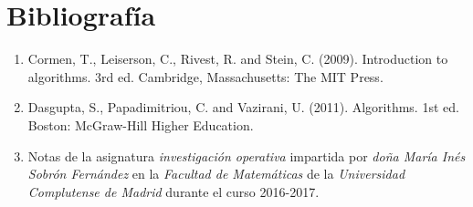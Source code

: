 \section{Bibliografía}

\begin{enumerate}
\item Cormen, T., Leiserson, C., Rivest, R. and Stein, C. (2009). Introduction to algorithms. 3rd ed. Cambridge, Massachusetts: The MIT Press.
\item Dasgupta, S., Papadimitriou, C. and Vazirani, U. (2011). Algorithms. 1st ed. Boston: McGraw-Hill Higher Education.
\item Notas de la asignatura \textit{investigación operativa} impartida por \textit{doña María Inés Sobrón Fernández} en la \textit{Facultad de Matemáticas} de la \textit{Universidad Complutense de Madrid} durante el curso 2016-2017.
\end{enumerate}